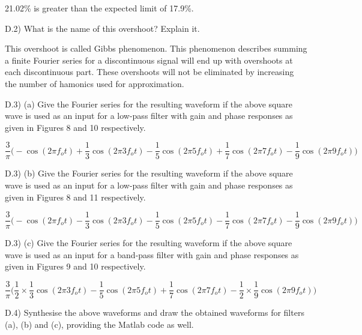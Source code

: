 21.02\% is greater than the expected limit of 17.9\%.

\begin{tcolorbox}
  D.2) What is the name of this overshoot? Explain it.
\end{tcolorbox}

This overshoot is called Gibbs phenomenon. This phenomenon describes summing a finite Fourier series for a discontinuous signal will end up with overshoots at each discontinuous part. These overshoots will not be eliminated by increasing the number of hamonics used for approximation.

\begin{tcolorbox}
  D.3) (a) Give the Fourier series for the resulting waveform if the above square wave is used as an input for a low-pass filter with gain and phase responses as given in Figures 8 and 10 respectively.
\end{tcolorbox}

\[ \frac{3}{\pi}\Big( - \cos(2\pi f_o t) + \frac{1}{3}\cos(2\pi 3f_o t) - \frac{1}{5}\cos(2\pi 5f_o t) + \frac{1}{7}\cos(2\pi 7f_o t) - \frac{1}{9}\cos(2\pi 9f_o t)\Big) \]

\begin{tcolorbox}
  D.3) (b) Give the Fourier series for the resulting waveform if the above square wave is used as an input for a low-pass filter with gain and phase responses as given in Figures 8 and 11 respectively.
\end{tcolorbox}

\[ \frac{3}{\pi}\Big( - \cos(2\pi f_o t) - \frac{1}{3}\cos(2\pi 3f_o t) - \frac{1}{5}\cos(2\pi 5f_o t) - \frac{1}{7}\cos(2\pi 7f_o t) - \frac{1}{9}\cos(2\pi 9f_o t)\Big) \]

\begin{tcolorbox}
  D.3) (c) Give the Fourier series for the resulting waveform if the above square wave is used as an input for a band-pass filter with gain and phase responses as given in Figures 9 and 10 respectively.
\end{tcolorbox}

\[ \frac{3}{\pi}\Big(\frac{1}{2} \times \frac{1}{3}\cos(2\pi 3f_o t) - \frac{1}{5}\cos(2\pi 5f_o t) + \frac{1}{7}\cos(2\pi 7f_o t) - \frac{1}{2} \times \frac{1}{9}\cos(2\pi 9f_o t)\Big) \]

\begin{tcolorbox}
  D.4) Synthesise the above waveforms and draw the obtained waveforms for filters (a), (b) and (c), providing the Matlab code as well.
\end{tcolorbox}

